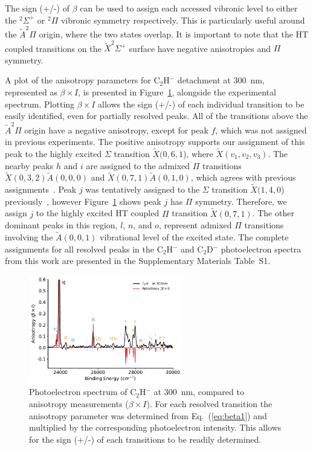 \documentclass[journal=jpcafh,manuscript=article,layout=onecolumn, 12pt]{achemso}
\begin{document}
The sign (+/-) of $\beta$ can be used to assign each accessed vibronic level to either the $^2\Sigma^+$ or $^2\Pi$ vibronic symmetry respectively. This is particularly useful around the $\tilde{A} ^2\Pi$ origin, where the two states overlap. It is important to note that the HT coupled transitions on the $\tilde{X} ^2\Sigma^+$ surface have negative anisotropies and $\Pi$ symmetry. 

A plot of the anisotropy parameters for C$_2$H$^-$ detachment at 300~nm, represented as $\beta\times I$, is presented in Figure~\ref{fig:6}, alongside the experimental spectrum. Plotting $\beta\times I$ allows the sign (+/-) of each individual transition to be easily identified, even for partially resolved peaks. All of the transitions above the $\tilde{A} ^2\Pi$ origin have a negative anisotropy, except for peak $f$, which was not assigned in previous experiments. The positive anisotropy supports our assignment of this peak to the highly excited $\Sigma$ transition $\tilde{X}(0,6,1$), where $\tilde{X}(v_1,v_2,v_3)$. The nearby peaks $h$ and $i$  are assigned to the admixed $\Pi$ transitions $\tilde{X}(0,3,2)\tilde{A}(0,0,0)$ and $\tilde{X}(0,7,1)\tilde{A}(0,1,0)$, which agrees with previous assignments~\cite{zho07,tar03}. Peak $j$ was tentatively assigned to the $\Sigma$ transition $\tilde{X}(1,4,0$) previously~\cite{zho07}, however Figure~\ref{fig:6} shows peak $j$ has $\Pi$ symmetry. Therefore, we assign $j$ to the highly excited HT coupled $\Pi$ transition $\tilde{X}(0,7,1)$. The other dominant peaks in this region, $l$, $n$, and $o$, represent admixed $\Pi$ transitions involving the $\tilde{A}(0,0,1)$ vibrational level of the excited state. The complete assignments for all resolved peaks in the C$_2$H$^-$ and C$_2$D$^-$ photoelectron spectra from this work are presented in the Supplementary Materials Table~S1.

\begin{figure}[th!]
	\includegraphics[width=0.6\textwidth]{figures/plotBeta.pdf}
	\caption{Photoelectron spectrum of C$_2$H$^-$ at 300~nm, compared to anisotropy measurements ($\beta\times I$). For each resolved transition the anisotropy parameter was determined from Eq.~(\ref{eq:beta1}) and multiplied by the corresponding photoelectron intensity. This allows for the sign (+/-) of each transitions to be readily determined.}
	\label{fig:6}
\end{figure}
\end{document}
